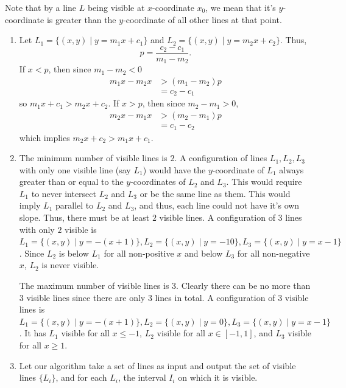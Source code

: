 \documentclass[12 pt, letterpaper]{hmcpset}
\begin{document}
\begin{solution}
	Note that by a line $L$ being visible at $x$-coordinate $x_{0}$, we mean that it's $y$-coordinate is greater than the $y$-coordinate of all other lines at that point.
	\begin{enumerate}
		\item Let $L_{1} = \{ (x, y) \mid y = m_{1} x + c_{1} \}$ and $L_{2} = \{ (x, y) \mid y = m_{2} x + c_{2} \}$. Thus,
			\[
				p = \frac{c_{2} - c_{1}}{m_{1} - m_{2}}.
			\]
			If $x < p$, then since $m_{1} - m_{2} < 0$
			\begin{align*}
				m_{1} x - m_{2} x & > (m_{1} - m_{2}) p \\
						  & = c_{2} - c_{1}
			\end{align*}
			so $m_{1} x + c_{1} > m_{2} x + c_{2}$. If $x > p$, then since $m_{2} - m_{1} > 0$,
			\begin{align*}
				m_{2} x - m_{1} x & > (m_{2} - m_{1}) p \\
						  & = c_{1} - c_{2}
			\end{align*}
			which implies $m_{2} x + c_{2} > m_{1} x + c_{1}$.

		\item The minimum number of visible lines is $2$. A configuration of lines $L_{1}, L_{2}, L_{3}$ with only one visible line (say $L_{1}$) would have the $y$-coordinate of $L_{1}$ always greater than or equal to the $y$-coordinates of $L_{2}$ and $L_{3}$. This would require $L_{1}$ to never intersect $L_{2}$ and $L_{3}$ or be the same line as them. This would imply $L_{1}$ parallel to $L_{2}$ and $L_{3}$, and thus, each line could not have it's own slope. Thus, there must be at least $2$ visible lines. A configuration of $3$ lines with only $2$ visible is $L_{1} = \{ (x, y) \mid y = -(x + 1) \}, L_{2} = \{ (x, y) \mid y = - 10 \}, L_{3} = \{ (x, y) \mid y = x - 1 \}$. Since $L_{2}$ is below $L_{1}$ for all non-positive $x$ and below $L_{3}$ for all non-negative $x$, $L_{2}$ is never visible. 

			The maximum number of visible lines is $3$. Clearly there can be no more than $3$ visible lines since there are only $3$ lines in total. A configuration of $3$ visible lines is $L_{1} = \{ (x, y) \mid y = - (x + 1) \}, L_{2} = \{ (x, y) \mid y = 0 \}, L_{3} = \{ (x, y) \mid y = x - 1 \}$. It has $L_{1}$ visible for all $x \le -1$, $L_{2}$ visible for all $x \in [-1, 1]$, and  $L_{3}$ visible for all $x \ge 1$.

		\item Let our algorithm take a set of lines as input and output the set of visible lines $\{ L_{i} \}$, and for each $L_{i}$, the interval $I_{i}$ on which it is visible.


\end{enumerate}
\end{solution}
\end{document}
